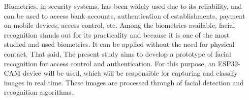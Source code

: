 
\begin{abstractutfpr}%
	Biometrics, in security systems, has been widely used due to its
	reliability, and can be used to access bank accounts, authentication of
	establishments, payment on mobile devices, access control, etc.
	Among the biometrics available, facial recognition stands out for its
	practicality and because it is one of the most studied and used biometrics.
	It can be applied without the need for physical contact. That said,
	The present study aims to develop a prototype of
	facial recognition for access control and authentication. For this purpose,
	an ESP32-CAM device will be used, which will be responsible for capturing and
	classify images in real time. These images are processed through
	of facial detection and recognition algorithms.
\end{abstractutfpr}
